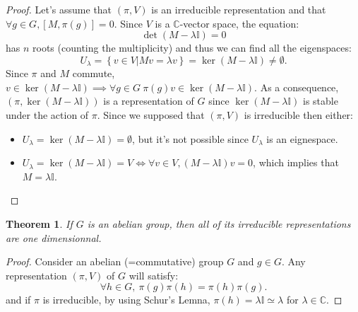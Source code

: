 \documentclass[11pt,a4paper]{article}
\newtheorem{theorem}{Theorem}[section]
\theoremstyle{definition}
\numberwithin{equation}{section}
\begin{document}
\begin{proof}
    Let's assume that $(\pi,V)$ is an irreducible representation and that $\forall g \in G, \left[M,\pi(g)\right] = 0$. Since $V$ is a $\mathbb{C}$-vector space, the equation:
    \begin{equation*}
        \det(M-\lambda \mathbb{I}) = 0
    \end{equation*}
    has $n$ roots (counting the multiplicity) and thus we can find all the eigenspaces:
    \begin{equation*}
        U_\lambda = \left\{v\in V | Mv = \lambda v\right\} = \ker\left(M-\lambda \mathbb{I}\right) \neq  \emptyset .
    \end{equation*}
    Since $\pi$ and $M$ commute, $v\in\ker\left(M-\lambda \mathbb{I}\right) \implies  \forall g \in G\ \pi(g)v \in \ker\left(M-\lambda \mathbb{I}\right) $.
    As a consequence, $(\pi,\ker\left(M-\lambda \mathbb{I}\right))$ is a representation of $G$ since $\ker\left(M-\lambda \mathbb{I}\right)$ is stable under the action of $\pi$.
    Since we supposed that $(\pi,V)$ is irreducible then either:
    \begin{itemize}
        \item $U_\lambda = \ker\left(M-\lambda \mathbb{I}\right) = \emptyset$, but it's not possible since $U_\lambda$ is an eignespace.
        \item $U_\lambda = \ker\left(M-\lambda \mathbb{I}\right) = V \Leftrightarrow \forall v \in V, (M-\lambda \mathbb{I})v=0$, which implies that $M = \lambda \mathbb{I}$.
    \end{itemize}
\end{proof}
\begin{theorem}
    If $G$ is an abelian group, then all of its irreducible representations are one dimensionnal.
\end{theorem}
\begin{proof}
    Consider an abelian (=commutative) group $G$ and $g \in G$.
    Any representation $(\pi,V)$ of $G$ will satisfy:
    \begin{equation*}
       \forall h \in G,\  \pi(g) \pi(h) = \pi(h) \pi(g).
    \end{equation*}
and if $\pi$ is irreducible, by using Schur's Lemna, $\pi(h) = \lambda \mathbb{I} \simeq \lambda$ for $\lambda \in \mathbb{C}$.
\end{proof}
\end{document}
